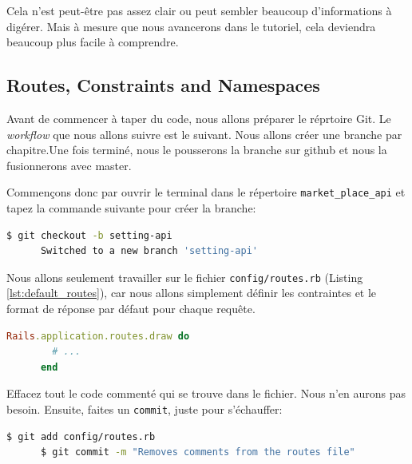 \documentclass[]{report}
\begin{document}
    Cela n'est peut-être pas assez clair ou peut sembler beaucoup d'informations à digérer. Mais à mesure que nous avancerons dans le tutoriel, cela deviendra beaucoup plus facile à comprendre.

    \subsection{Routes, Constraints and Namespaces}

      Avant de commencer à taper du code, nous allons préparer le réprtoire Git. Le \textit{workflow} que nous allons suivre est le suivant. Nous allons créer une branche par chapitre.Une fois terminé, nous le pousserons la branche sur github et nous la fusionnerons avec master.

      Commençons donc par ouvrir le terminal dans le répertoire \verb|market_place_api| et tapez la commande suivante pour créer la branche:

      \begin{scriptsize}
      \begin{lstlisting}[language=bash]
      $ git checkout -b setting-api
      Switched to a new branch 'setting-api'
      \end{lstlisting}
      \end{scriptsize}

      Nous allons seulement travailler sur le fichier \verb|config/routes.rb| (Listing \ref{lst:default_routes}), car nous allons simplement définir les contraintes et le format de réponse par défaut pour chaque requête.

      \begin{scriptsize}
      \begin{lstlisting}[language=ruby, caption={Le fichier routes.rb par défault}, label={lst:default_routes}]
      Rails.application.routes.draw do
        # ...
      end
      \end{lstlisting}
      \end{scriptsize}

      Effacez tout le code commenté qui se trouve dans le fichier. Nous n'en aurons pas besoin. Ensuite, faites un \verb|commit|, juste pour s'échauffer:

      \begin{scriptsize}
      \begin{lstlisting}[language=bash]
      $ git add config/routes.rb
      $ git commit -m "Removes comments from the routes file"
      \end{lstlisting}
      \end{scriptsize}
\end{document}
